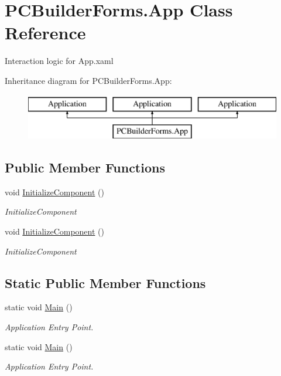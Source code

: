 \hypertarget{class_p_c_builder_forms_1_1_app}{}\section{P\+C\+Builder\+Forms.\+App Class Reference}
\label{class_p_c_builder_forms_1_1_app}


Interaction logic for App.\+xaml  


Inheritance diagram for P\+C\+Builder\+Forms.\+App\+:\begin{figure}[H]
\begin{center}
\leavevmode
\includegraphics[height=2.000000cm]{class_p_c_builder_forms_1_1_app}
\end{center}
\end{figure}
\subsection*{Public Member Functions}
\begin{DoxyCompactItemize}
\item 
void \hyperlink{class_p_c_builder_forms_1_1_app_af10a7f8ea27debb593e600d4b7e0550e}{Initialize\+Component} ()
\begin{DoxyCompactList}\small\item\em Initialize\+Component \end{DoxyCompactList}\item 
void \hyperlink{class_p_c_builder_forms_1_1_app_af10a7f8ea27debb593e600d4b7e0550e}{Initialize\+Component} ()
\begin{DoxyCompactList}\small\item\em Initialize\+Component \end{DoxyCompactList}\end{DoxyCompactItemize}
\subsection*{Static Public Member Functions}
\begin{DoxyCompactItemize}
\item 
static void \hyperlink{class_p_c_builder_forms_1_1_app_a8e0e2ce98707651cc8d9f09d9866f51a}{Main} ()
\begin{DoxyCompactList}\small\item\em Application Entry Point. \end{DoxyCompactList}\item 
static void \hyperlink{class_p_c_builder_forms_1_1_app_a8e0e2ce98707651cc8d9f09d9866f51a}{Main} ()
\begin{DoxyCompactList}\small\item\em Application Entry Point. \end{DoxyCompactList}\end{DoxyCompactItemize}


